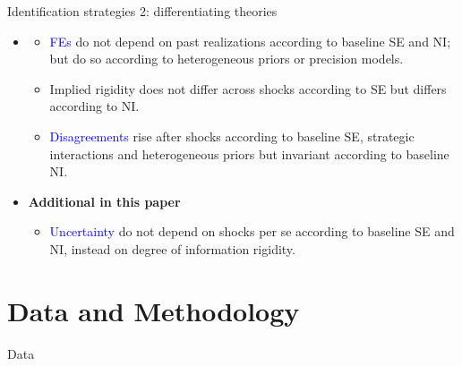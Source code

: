 \documentclass{beamer}
\begin{document}
\begin{frame}{Identification strategies 2: differentiating theories}
\begin{itemize}
	\item\cite{coibion2012can}
	\begin{itemize}
		\item \textcolor{blue}{FEs} do not depend on past realizations according to baseline SE and NI; but do so according to heterogeneous priors or precision models. 
		\item Implied rigidity does not differ across shocks according to SE but differs according to NI. 
		\item \textcolor{blue}{Disagreements} rise after shocks according to baseline SE, strategic interactions and heterogeneous priors but invariant according to baseline NI.
	\end{itemize}
	\item \textbf{Additional in this paper}
	\begin{itemize}
		\item \textcolor{blue}{Uncertainty} do not depend on shocks per se according to baseline SE and NI, instead on degree of information rigidity.
	\end{itemize}
\end{itemize}

\end{frame}

\section{Data and Methodology}


\begin{frame}{Data}
\begin{table}[]
\end{table}

\end{frame}
\end{document}
